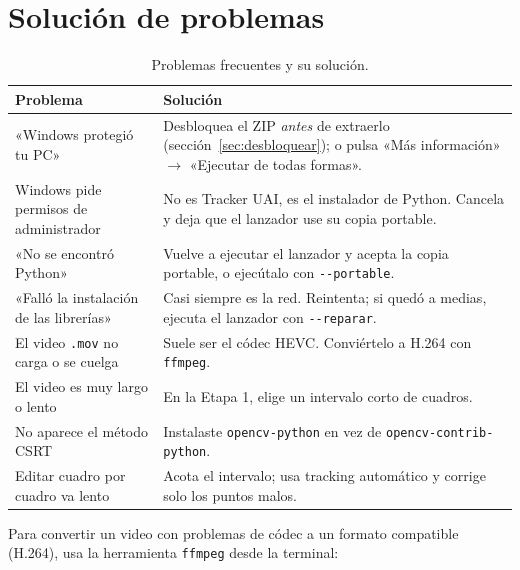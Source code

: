 \documentclass[11pt,a4paper]{article}
\begin{document}
\section{Solución de problemas}

\begin{table}[htbp]
  \centering
  \caption{Problemas frecuentes y su solución.}
  \label{tab:problemas}
  \begin{tabular}{@{}p{5.2cm} p{8.3cm}@{}}
    \toprule
    \textbf{Problema} & \textbf{Solución} \\
    \midrule
    «Windows protegió tu PC» & Desbloquea el ZIP \emph{antes} de extraerlo
      (sección~\ref{sec:desbloquear}); o pulsa «Más información»
      $\rightarrow$ «Ejecutar de todas formas». \\
    Windows pide permisos de administrador & No es Tracker UAI, es el
      instalador de Python. Cancela y deja que el lanzador use su copia
      portable. \\
    «No se encontró Python» & Vuelve a ejecutar el lanzador y acepta la copia
      portable, o ejecútalo con \texttt{-{}-portable}. \\
    «Falló la instalación de las librerías» & Casi siempre es la red. Reintenta;
      si quedó a medias, ejecuta el lanzador con \texttt{-{}-reparar}. \\
    El video \texttt{.mov} no carga o se cuelga & Suele ser el códec HEVC.
      Conviértelo a H.264 con \texttt{ffmpeg}. \\
    El video es muy largo o lento & En la Etapa 1, elige un intervalo corto de
      cuadros. \\
    No aparece el método CSRT & Instalaste \texttt{opencv-python} en vez de
      \texttt{opencv-contrib-python}. \\
    Editar cuadro por cuadro va lento & Acota el intervalo; usa tracking automático
      y corrige solo los puntos malos. \\
    \bottomrule
  \end{tabular}
\end{table}

\begin{alerta}
  Para convertir un video con problemas de códec a un formato compatible (H.264),
  usa la herramienta \texttt{ffmpeg} desde la terminal:
\end{alerta}
\end{document}
